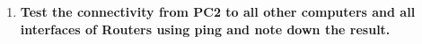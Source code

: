 \documentclass[a4paper,11pt]{article}
\begin{document}
\begin{enumerate}
    \item\textbf{ Test the connectivity from PC2 to all other computers and all interfaces of Routers using ping and note down the result.}



          \begin{table}[H]
              \centering


\end{table}
\end{enumerate}
\end{document}
